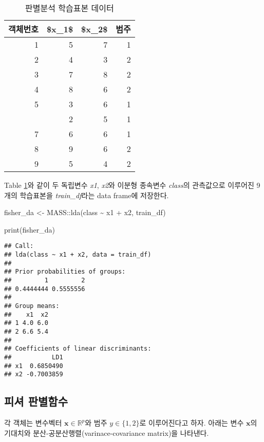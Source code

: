 \documentclass[
]{book}
\newenvironment{Shaded}{\begin{snugshade}}{\end{snugshade}}
\newcommand{\FunctionTok}[1]{\textcolor[rgb]{0.00,0.00,0.00}{#1}}
\newcommand{\NormalTok}[1]{#1}
\newcommand{\OtherTok}[1]{\textcolor[rgb]{0.56,0.35,0.01}{#1}}
\newcommand{\SpecialCharTok}[1]{\textcolor[rgb]{0.00,0.00,0.00}{#1}}
\begin{document}
\begin{table}

\caption{\label{tab:da-train-data-table}판별분석 학습표본 데이터}
\centering
\begin{tabular}[t]{rrrr}
\toprule
객체번호 & \$x\_1\$ & \$x\_2\$ & 범주\\
\midrule
1 & 5 & 7 & 1\\
2 & 4 & 3 & 2\\
3 & 7 & 8 & 2\\
4 & 8 & 6 & 2\\
5 & 3 & 6 & 1\\
\addlinespace
6 & 2 & 5 & 1\\
7 & 6 & 6 & 1\\
8 & 9 & 6 & 2\\
9 & 5 & 4 & 2\\
\bottomrule
\end{tabular}
\end{table}

Table \ref{tab:da-train-data-table}와 같이 두 독립변수 \emph{x1}, \emph{x2}와 이분형 종속변수 \emph{class}의 관측값으로 이루어진 9개의 학습표본을 \emph{train\_df}라는 data frame에 저장한다.

\begin{Shaded}
\begin{Highlighting}[]
\NormalTok{fisher\_da }\OtherTok{\textless{}{-}}\NormalTok{ MASS}\SpecialCharTok{::}\FunctionTok{lda}\NormalTok{(class }\SpecialCharTok{\textasciitilde{}}\NormalTok{ x1 }\SpecialCharTok{+}\NormalTok{ x2, train\_df)}

\FunctionTok{print}\NormalTok{(fisher\_da)}
\end{Highlighting}
\end{Shaded}

\begin{verbatim}
## Call:
## lda(class ~ x1 + x2, data = train_df)
## 
## Prior probabilities of groups:
##         1         2 
## 0.4444444 0.5555556 
## 
## Group means:
##    x1  x2
## 1 4.0 6.0
## 2 6.6 5.4
## 
## Coefficients of linear discriminants:
##           LD1
## x1  0.6850490
## x2 -0.7003859
\end{verbatim}

\hypertarget{uxd53cuxc154-uxd310uxbcc4uxd568uxc218}{%
\subsection{피셔 판별함수}\label{uxd53cuxc154-uxd310uxbcc4uxd568uxc218}}

각 객체는 변수벡터 \(\mathbf{x} \in \mathbb{R}^p\)와 범주 \(y \in \{1, 2\}\)로 이루어진다고 하자. 아래는 변수 \(\mathbf{x}\)의 기대치와 분산-공분산행렬(varinace-covariance matrix)을 나타낸다.
\end{document}
